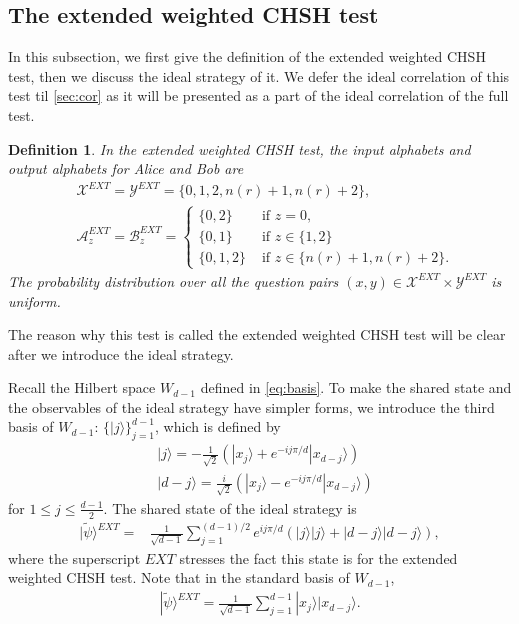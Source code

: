 \documentclass[11pt,letterpaper]{article}
\newcommand{\ket}[1]{|#1\rangle}
\newcommand{\calX}{\mathcal{X}}
\newcommand{\calY}{\mathcal{Y}}
\newcommand{\calA}{\mathcal{A}}
\newcommand{\calB}{\mathcal{B}}
\newcommand{\1}{\mathbb{1}}
\newcommand{\EXT}{EXT}
\newcommand{\tpsi}{\tilde{\psi}}
\newcommand{\nr}{n(r)}
\newtheorem{definition}[theorem]{Definition}
\theoremstyle{definition}
\begin{document}
\subsection{The extended weighted CHSH test}
\label{sec:ext_w_chsh}
In this subsection, we first give the definition of the 
extended weighted CHSH test, then we discuss the ideal strategy of it.
We defer the ideal correlation of this test til \cref{sec:cor}
as it will be presented as a part of the ideal correlation of the full test.
\begin{definition}
    \label{def:ext_w_chsh}
    In the extended weighted CHSH test, the input alphabets and output alphabets for Alice and Bob are
    \begin{align*}
        &\calX^{\EXT} = \calY^{\EXT} = \{0, 1, 2, \nr+1, \nr+2\}, \\
        &\calA_z^{\EXT} = \calB_z^{\EXT} =
        \begin{cases}
            \{0,2\} &\text{ if } z = 0, \\
            \{0,1\} &\text{ if } z \in \{1, 2\} \\
            \{0,1,2\} &\text{ if } z \in \{\nr+1, \nr+2\}. 
        \end{cases}
    \end{align*}
    The probability distribution over all the question pairs 
    $(x,y) \in \calX^{\EXT} \times \calY^{\EXT}$ is uniform.
\end{definition}
The reason why this test is called the extended weighted CHSH test will be clear 
after we introduce the ideal strategy.

Recall the Hilbert space $W_{d-1}$ defined in \cref{eq:basis}. 
To make the shared state and the observables of the ideal strategy have
simpler forms, we introduce the third basis of $W_{d-1}$: $\{ \ket{j} \}_{j=1}^{d-1}$, which is defined by
\begin{align*}
    &\ket{j} = -\frac{1}{\sqrt{2}}(\ket{x_j} + e^{-ij\pi/d}\ket{x_{d-j}}) \\
    &\ket{d-j} = \frac{i}{\sqrt{2}}(\ket{x_j} - e^{-ij\pi/d}\ket{x_{d-j}})
\end{align*}
for $1 \leq j \leq \frac{d-1}{2}$.
The shared state of the ideal strategy is 
\begin{equation}
    \label{eq:tpsi}
    \begin{aligned}
        \ket{\tpsi}^{\EXT}
         =& \frac{1}{\sqrt{d-1}} \sum_{j=1}^{(d-1)/2} e^{ij\pi/d}(\ket{j}\ket{j} + \ket{d-j}\ket{d-j}),
    \end{aligned}
\end{equation}
where the superscript $\EXT$ stresses the fact this state is for the extended weighted CHSH test.
Note that in the standard basis of $W_{d-1}$,
\begin{align*}
    \ket{\tpsi}^{\EXT} = \frac{1}{\sqrt{d-1}} \sum_{j=1}^{d-1} \ket{x_j}\ket{x_{d-j}}.
\end{align*}
\end{document}

